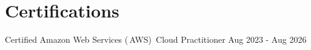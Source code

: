 \documentclass[letterpaper,11pt]{article}
\makeatletter
\newcommand{\resumeItem}[1]{
  \item\small{
    {#1 \vspace{-2pt}}
  }
}
\newcommand{\resumeSubheading}[4]{
  \vspace{-2pt}\item
    \begin{tabular*}{0.97\textwidth}[t]{l@{\extracolsep{\fill}}r}
      \textbf{#1} & #2 \\
      \textit{\small#3} & \textit{\small #4} \\
    \end{tabular*}\vspace{-2pt}
}
\newcommand{\resumeItemListStart}{\begin{itemize}}
\newcommand{\resumeItemListEnd}{\end{itemize}\vspace{-5pt}}
\makeatother
\begin{document}

\section{Certifications}
{\hspace*{0.5em} Certified Amazon Web Services (\,AWS)\, Cloud Practitioner}\hspace*{\fill} Aug 2023 - Aug 2026
\end{document}
